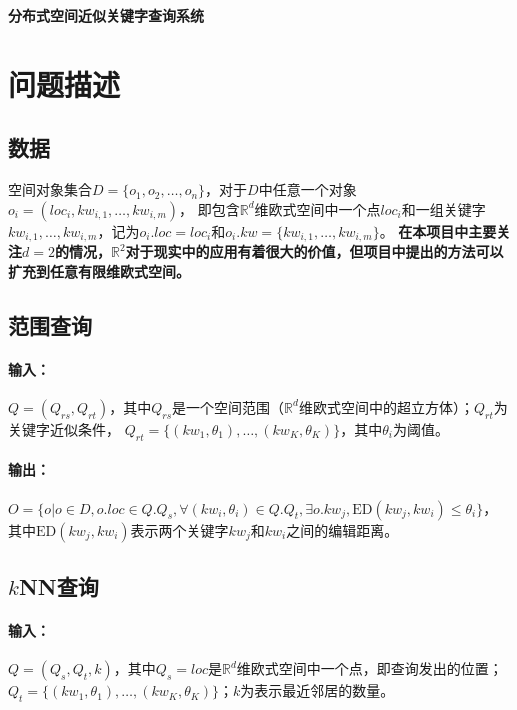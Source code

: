 \documentclass{ML}
\begin{document}
\maketitle

\tableofcontents
\newpage

\begin{center}
  \textbf{ 分布式空间近似关键字查询系统}
\end{center}

\section{问题描述}
\subsection{数据}\label{sec:data}
空间对象集合$D = \{o_1, o_2, \dots, o_n\}$，对于$D$中任意一个对象$o_i = (loc_i, kw_{i, 1}, \dots, kw_{i, m})$，
即包含$\mathbb{R}^d$维欧式空间中一个点$loc_i$和一组关键字$kw_{i, 1}, \dots, kw_{i, m}$，记为$o_i.loc = loc_i$和$o_i.kw = \{kw_{i, 1}, \dots, kw_{i, m}\}$。
\textbf{在本项目中主要关注$d = 2$的情况，$\mathbb{R}^2$对于现实中的应用有着很大的价值，但项目中提出的方法可以扩充到任意有限维欧式空间。}

\subsection{范围查询}\label{sec:range-query}
\paragraph{输入：}$Q = (Q_{rs}, Q_{rt})$，其中$Q_{rs}$是一个空间范围（$\mathbb{R}^d$维欧式空间中的超立方体）；$Q_{rt}$为关键字近似条件，
$Q_{rt} = \{(kw_1, \theta_1), \dots, (kw_K, \theta_K)\}$，其中$\theta_i$为阈值。
\paragraph{输出：}$O = \{o | o \in D, o.loc \in Q.Q_s, \forall(kw_i, \theta_i) \in Q.Q_t, \exists o.kw_j, \mathrm{ED}(kw_j, kw_i) \leq \theta_i\}$，
其中$\mathrm{ED}(kw_j, kw_i)$表示两个关键字$kw_j$和$kw_i$之间的编辑距离。

\subsection{$k$NN查询}\label{sec:knn_query}
\paragraph{输入：} $Q = (Q_s, Q_t, k)$，其中$Q_s = loc$是$\mathbb{R}^d$维欧式空间中一个点，即查询发出的位置；
$Q_t = \{(kw_1, \theta_1), \dots, (kw_K, \theta_K)\}$；$k$为表示最近邻居的数量。
\end{document}
